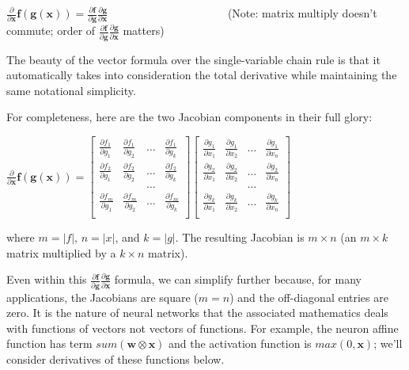 \documentclass[11pt]{article}
\begin{document}
$\frac{\partial}{\partial \mathbf{x}} \mathbf{f}(\mathbf{g}(\mathbf{x})) = \frac{\partial \mathbf{f}}{\partial \mathbf{g}}\frac{\partial\mathbf{g}}{\partial \mathbf{x}}$ ~~~~~~~~~~~~~~~~~~~~~(Note: matrix multiply doesn't commute; order of $\frac{\partial \mathbf{f}}{\partial \mathbf{g}}\frac{\partial\mathbf{g}}{\partial \mathbf{x}}$ matters)

The beauty of the vector formula over the single-variable chain rule is that it automatically takes into consideration the total derivative while maintaining the same notational simplicity. 

For completeness, here are the two Jacobian components in their full glory:

$
\frac{\partial}{\partial \mathbf{x}} \mathbf{f}(\mathbf{g}(\mathbf{x})) = \begin{bmatrix}
	\frac{\partial f_1}{\partial g_1} & \frac{\partial f_1}{\partial g_2} & \ldots & \frac{\partial f_1}{\partial g_k}\\
	\frac{\partial f_2}{\partial g_1} & \frac{\partial f_2}{\partial g_2} & \ldots & 	
\frac{\partial f_2}{\partial g_k}\\
	& &\ldots\\
	\frac{\partial f_m}{\partial g_1} & \frac{\partial f_m}{\partial g_2} & \ldots & \frac{\partial f_m}{\partial g_k}\\
\end{bmatrix}\begin{bmatrix}
	\frac{\partial g_1}{\partial x_1} & \frac{\partial g_1}{\partial x_2} & \ldots & \frac{\partial g_1}{\partial x_n}\\
	\frac{\partial g_2}{\partial x_1} & \frac{\partial g_2}{\partial x_2} & \ldots & 	
\frac{\partial g_2}{\partial x_n}\\
	& &\ldots\\
	\frac{\partial g_k}{\partial x_1} & \frac{\partial g_k}{\partial x_2} & \ldots & \frac{\partial g_k}{\partial x_n}\\
\end{bmatrix}
$

where $m=|f|$, $n=|x|$, and $k=|g|$. The resulting Jacobian is $m \times n$ (an $m \times k$ matrix multiplied by a $k \times n$ matrix). 

Even within this $\frac{\partial \mathbf{f}}{\partial \mathbf{g}}\frac{\partial\mathbf{g}}{\partial \mathbf{x}}$ formula, we can simplify further because, for many applications, the Jacobians are square ($m=n$) and the off-diagonal entries are zero.  It is the nature of neural networks that the associated mathematics deals with functions of vectors not vectors of functions. For example, the neuron affine function has term $sum(\mathbf{w}\otimes\mathbf{x})$ and the activation function is $max(0,\mathbf{x})$; we'll consider derivatives of these functions below.  
\end{document}
